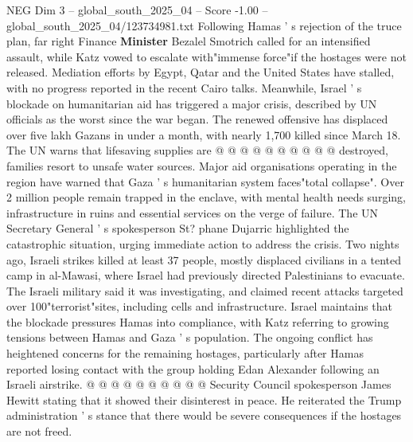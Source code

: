\begin{textsample}{NEG Dim 3 – global\_south\_2025\_04 – Score -1.00 – global\_south\_2025\_04/123734981.txt}
Following Hamas ' s rejection of the truce plan, far right Finance \textbf{Minister} Bezalel Smotrich called for an intensified assault, while Katz vowed to escalate with"immense force"if the hostages were not released.
Mediation efforts by Egypt, Qatar and the United States have stalled, with no progress reported in the recent Cairo talks.
Meanwhile, Israel ' s blockade on humanitarian aid has triggered a major crisis, described by UN officials as the worst since the war began.
The renewed offensive has displaced over five lakh Gazans in under a month, with nearly 1,700 killed since March 18.
The UN warns that lifesaving supplies are @ @ @ @ @ @ @ @ @ @ destroyed, families resort to unsafe water sources.
Major aid organisations operating in the region have warned that Gaza ' s humanitarian system faces"total collapse".
Over 2 million people remain trapped in the enclave, with mental health needs surging, infrastructure in ruins and essential services on the verge of failure.
The UN Secretary General ' s spokesperson St? phane Dujarric highlighted the catastrophic situation, urging immediate action to address the crisis.
Two nights ago, Israeli strikes killed at least 37 people, mostly displaced civilians in a tented camp in al-Mawasi, where Israel had previously directed Palestinians to evacuate.
The Israeli military said it was investigating, and claimed recent attacks targeted over 100"terrorist"sites, including cells and infrastructure.
Israel maintains that the blockade pressures Hamas into compliance, with Katz referring to growing tensions between Hamas and Gaza ' s population.
The ongoing conflict has heightened concerns for the remaining hostages, particularly after Hamas reported losing contact with the group holding Edan Alexander following an Israeli airstrike. @ @ @ @ @ @ @ @ @ @ Security Council spokesperson James Hewitt stating that it showed their disinterest in peace.
He reiterated the Trump administration ' s stance that there would be severe consequences if the hostages are not freed.

\end{textsample}
